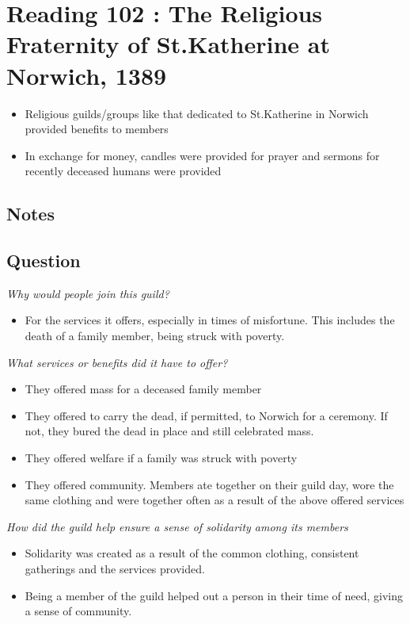 \documentclass[12pt]{article}
\begin{document}
{\section*{Reading 102 : The Religious Fraternity of St.Katherine at Norwich, 1389}

\begin{itemize}
	\item Religious guilds/groups like that dedicated to St.Katherine in Norwich provided benefits to members
	\item In exchange for money, candles were provided for prayer and sermons for recently deceased humans were provided
\end{itemize}

\subsection*{Notes}

\subsection*{Question}
\textit{Why would people join this guild?}
\begin{itemize}
	\item For the services it offers, especially in times of misfortune. This includes the death of a family member, being struck with poverty.
\end{itemize}

\textit{What services or benefits did it have to offer?}
\begin{itemize}
	\item They offered mass for a deceased family member
	\item They offered to carry the dead, if permitted, to Norwich for a ceremony. If not, they bured the dead in place and still celebrated mass.
	\item They offered welfare if a family was struck with poverty
	\item They offered community. Members ate together on their guild day, wore the same clothing and were together often as a result of the above offered services
\end{itemize}

\textit{How did the guild help ensure a sense of solidarity among its members}
\begin{itemize}
	\item Solidarity was created as a result of the common clothing, consistent gatherings and the services provided.
	\item Being a member of the guild helped out a person in their time of need, giving a sense of community.
\end{itemize}

}
\end{document}
